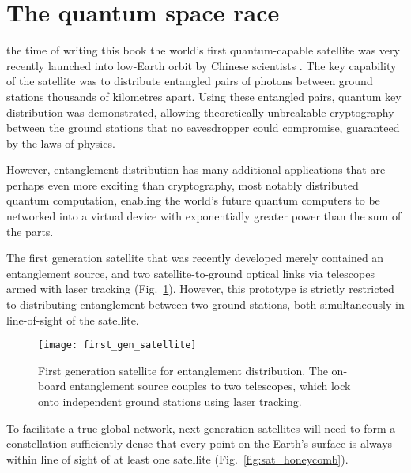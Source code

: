 %
%

\section{The quantum space race}\label{sec:quant_space_race_essay}

 the time of writing this book the world's first quantum-capable satellite was very recently launched into low-Earth orbit by Chinese scientists \cite{JWP}. The key capability of the satellite was to distribute entangled pairs of photons between ground stations thousands of kilometres apart. Using these entangled pairs, quantum key distribution was demonstrated, allowing theoretically unbreakable cryptography between the ground stations that no eavesdropper could compromise, guaranteed by the laws of physics.

However, entanglement distribution has many additional applications that are perhaps even more exciting than cryptography, most notably distributed quantum computation, enabling the world's future quantum computers to be networked into a virtual device with exponentially greater power than the sum of the parts.

The first generation satellite that was recently developed merely contained an entanglement source, and two satellite-to-ground optical links via telescopes armed with laser tracking (Fig.~\ref{fig:first_gen_sat}). However, this prototype is strictly restricted to distributing entanglement between two ground stations, both simultaneously in line-of-sight of the satellite.

\begin{figure}[!htbp]
\texttt{[image: first\_gen\_satellite]}
\caption{First generation satellite for entanglement distribution. The on-board entanglement source couples to two telescopes, which lock onto independent ground stations using laser tracking.}\label{fig:first_gen_sat}	
\end{figure}

To facilitate a true global network, next-generation satellites will need to form a constellation sufficiently dense that every point on the Earth's surface is always within line of sight of at least one satellite (Fig.~\ref{fig:sat_honeycomb}).

